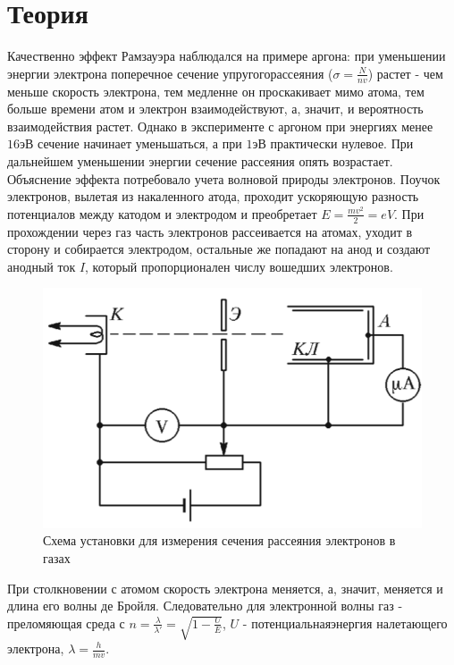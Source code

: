 \documentclass[a4paper]{article}
\begin{document}
\section{Теория}
Качественно эффект Рамзауэра наблюдался на примере аргона: при уменьшении энергии электрона поперечное сечение упругогорассеяния ($\sigma = \frac{N}{nv}$) растет - чем меньше скорость электрона, тем медленне он проскакивает мимо атома, тем больше времени атом и электрон взаимодействуют, а, значит, и вероятность взаимодействия растет. Однако в эксперименте с аргоном при энергиях менее $16эВ$ сечение начинает уменьшаться, а при $1эВ$ практически нулевое. При дальнейшем уменьшении энергии сечение рассеяния опять возрастает.
\\
Объяснение эффекта потребовало учета волновой природы электронов.  Поучок электронов, вылетая из накаленного атода, проходит ускоряющую разность потенциалов между катодом и электродом и преобретает $E=\frac{mv^2}{2}=eV$. При прохождении через газ часть электронов рассеивается на атомах, уходит в сторону и собирается электродом, остальные же попадают на анод и создают анодный ток $I$, который пропорционален числу вошедших электронов.

\begin{figure}[H]
  \begin{center}
  \includegraphics[scale = 0.5]{схема.png}
  \caption{Схема установки для измерения сечения рассеяния электронов в газах}
  \end{center}
\end{figure}

При столкновении с атомом скорость электрона меняется, а, значит, меняется и длина его волны де Бройля. Следовательно для электронной волны газ - преломяющая среда с $n = \frac{\lambda}{\lambda'}= \sqrt{1 - \frac{U}{E}}$, $U$ - потенциальнаяэнергия налетающего электрона, $\lambda = \frac{h}{mv}$.
\end{document}
